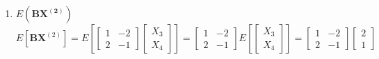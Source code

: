 \begin{enumerate}[label=(\alph*)]
\[\begin{bmatrix}
                        X_4
                    \end{bmatrix}
                \right]
                =
                \begin{bmatrix}
                    E[X_3] \\
                    E[X_4]
                \end{bmatrix}
                =
                \begin{bmatrix}
                    \mu_3 \\
                    \mu_4
                \end{bmatrix}
                =\begin{bmatrix}
                    2 \\
                    1
                \end{bmatrix}
            \]
            \item $E\left(\mathbf{B}\mathbf{X^{(2)}}\right)$
            \[
                E\left[\mathbf{B}\mathbf{X}^{(2)}\right]
                =
                E\left[
                    \begin{bmatrix}
                        1 & -2 \\
                        2 & -1
                    \end{bmatrix}
                    \begin{bmatrix}
                        X_3 \\
                        X_4
                    \end{bmatrix}
                \right]
                =
                \begin{bmatrix}
                    1 & -2 \\
                    2 & -1
                \end{bmatrix}
                E\left[
                    \begin{bmatrix}
                        X_3 \\
                        X_4
                    \end{bmatrix}
                \right]
                =
                \begin{bmatrix}
                    1 & -2 \\
                    2 & -1
                \end{bmatrix}
                \begin{bmatrix}
                    2 \\
                    1
                \end{bmatrix}
\]
\end{enumerate}
